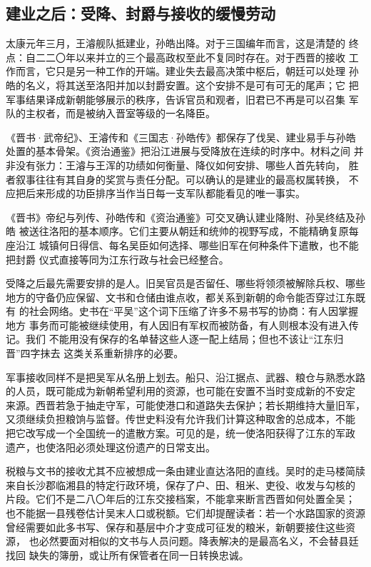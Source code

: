\subsection{建业之后：受降、封爵与接收的缓慢劳动}

太康元年三月，王濬舰队抵建业，孙皓出降。对于三国编年而言，这是清楚的
终点：自二二〇年以来并立的三个最高政权至此不复同时存在。对于西晋的接收
工作而言，它只是另一种工作的开端。建业失去最高决策中枢后，朝廷可以处理
孙皓的名义，将其送至洛阳并加以封爵安置。这个安排不是可有可无的尾声；它
把军事结果译成新朝能够展示的秩序，告诉官员和观者，旧君已不再是可以召集
军队的主权者，而是被纳入晋室等级的一名降臣。

《晋书·武帝纪》、王濬传和《三国志·孙皓传》都保存了伐吴、建业易手与孙皓
处置的基本骨架。《资治通鉴》把沿江进展与受降放在连续的时序中。材料之间
并非没有张力：王濬与王浑的功绩如何衡量、降仪如何安排、哪些人首先转向，
胜者叙事往往有其自身的奖赏与责任分配。可以确认的是建业的最高权属转换，
不应把后来形成的功臣排序当作当日每一支军队都能看见的唯一事实。

\begin{sourcenote}
《晋书》帝纪与列传、孙皓传和《资治通鉴》可交叉确认建业降附、孙吴终结及孙皓
被送往洛阳的基本顺序。它们主要从朝廷和统帅的视野写成，不能精确复原每座沿江
城镇何日得信、每名吴臣如何选择、哪些旧军在何种条件下遣散，也不能把封爵
仪式直接等同为江东行政与社会已经整合。
\end{sourcenote}

受降之后最先需要安排的是人。旧吴官员是否留任、哪些将领须被解除兵权、哪些
地方的守备仍应保留、文书和仓储由谁点收，都关系到新朝的命令能否穿过江东既有
的社会网络。史书在“平吴”这个词下压缩了许多不易书写的协商：有人因掌握地方
事务而可能被继续使用，有人因旧有军权而被防备，有人则根本没有进入传记。我们
不能用没有保存的名单替这些人逐一配上结局；但也不该让“江东归晋”四字抹去
这类关系重新排序的必要。

军事接收同样不是把吴军从名册上划去。船只、沿江据点、武器、粮仓与熟悉水路
的人员，既可能成为新朝希望利用的资源，也可能在安置不当时变成新的不安定
来源。西晋若急于抽走守军，可能使港口和道路失去保护；若长期维持大量旧军，
又须继续负担粮饷与监督。传世史料没有允许我们计算这种取舍的总成本，不能
把它改写成一个全国统一的遣散方案。可见的是，统一使洛阳获得了江东的军政
遗产，也使洛阳必须处理这份遗产的日常支出。

税粮与文书的接收尤其不应被想成一条由建业直达洛阳的直线。吴时的走马楼简牍
来自长沙郡临湘县的特定行政环境，保存了户、田、租米、吏役、收发与勾核的
片段。它们不是二八〇年后的江东交接档案，不能拿来断言西晋如何处置全吴；
也不能据一县残卷估计吴末人口或税额。它们却提醒读者：若一个水路国家的资源
曾经需要如此多书写、保存和基层中介才变成可征发的粮米，新朝要接住这些资源，
也必然要面对相似的文书与人员问题。降表解决的是最高名义，不会替县廷找回
缺失的簿册，或让所有保管者在同一日转换忠诚。

